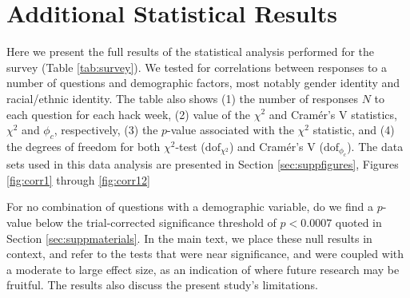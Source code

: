 \documentclass{aastex62}
\begin{document}
\clearpage

\section{Additional Statistical Results}

Here we present the full results of the statistical analysis performed for the survey (Table \ref{tab:survey}). We tested for correlations between responses to a number of questions and demographic factors, most notably gender identity and racial/ethnic identity. The table also shows (1) the number of responses $N$ to each question for each hack week, (2) value of the $\chi^2$ and Cram\'{e}r's V statistics, $\chi^2$ and $\phi_c$, respectively, (3) the $p$-value associated with the $\chi^2$ statistic, and (4) the degrees of freedom for both $\chi^2$-test ($\mathrm{dof}_{\chi^2}$) and Cram\'{e}r's V ($\mathrm{dof}_{\phi_c}$). The data sets used in this data analysis are presented in Section \ref{sec:suppfigures}, Figures \ref{fig:corr1} through \ref{fig:corr12}

For no combination of questions with a demographic variable, do we ﬁnd a $p$-value below the trial-corrected signiﬁcance threshold of $p < 0.0007$ quoted in Section \ref{sec:suppmaterials}. In the main text, we place these null results in context, and refer to the tests that were near significance, and were coupled with a moderate to large effect size, as an indication of where future research may be fruitful. The results also discuss the present study's limitations.
\end{document}
